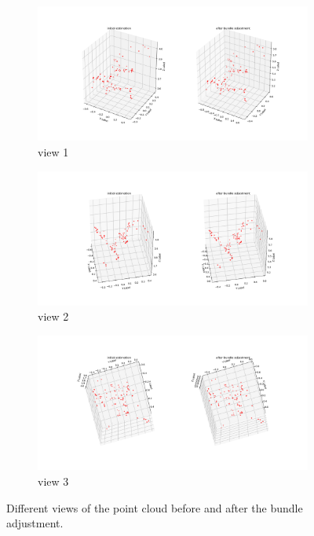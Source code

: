 \documentclass[11pt]{article}
\begin{document}
\begin{figure}[h!]
    \begin{subfigure}{\textwidth}
      \centering
      \includegraphics[width=.8\linewidth]{../results/q5_3_1.png}
      \caption{view 1}
    \end{subfigure}
    \begin{subfigure}{\textwidth}
      \centering
      \includegraphics[width=.8\linewidth]{../results/q5_3_2.png}
      \caption{view 2}
    \end{subfigure}
    \begin{subfigure}{\textwidth}
      \centering
      \includegraphics[width=.8\linewidth]{../results/q5_3_3.png}
      \caption{view 3}
    \end{subfigure}
    \caption{Different views of the point cloud before and after the bundle adjustment. }
    \label{fig:q5.3}
\end{figure}
\end{document}
